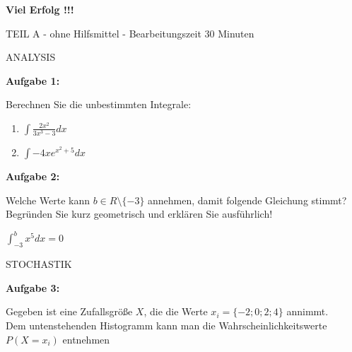 \documentclass[a4paper,12pt]{article}
\newcommand{\Aufgabe}[1]{
  {
  \vspace*{0.5cm}
  \textsf{\textbf{Aufgabe #1}}
  \vspace*{0.2cm}
  
  }
}
\begin{document}
\vspace{5cm}
\centerline{\huge\bfseries\sffamily Viel Erfolg !!!}

\newpage

\begin{center}
\vspace{0,5cm} {TEIL A} - ohne Hilfsmittel - Bearbeitungszeit 30 Minuten
\end{center}
\vspace {0,8cm}

ANALYSIS

\Aufgabe{1:} 
Berechnen Sie die unbestimmten Integrale:

\begin{enumerate}[label={\alph*)}]
  \item $ \int \frac{2x^2}{3x^3-3} dx $
  \item $ \int -4xe^{x^2+5} dx $
\end{enumerate}
\Aufgabe{2:}
Welche Werte kann $ b \in R\setminus \{ -3\}$ annehmen, damit folgende Gleichung stimmt? Begründen Sie kurz geometrisch und erklären Sie ausführlich!

 $ \int_ {-3}^{b} x^5 dx =0$

\vspace{2cm}
STOCHASTIK

\Aufgabe{3:}
Gegeben ist eine Zufallsgröße $X$, die die Werte $x_i = \{-2; 0; 2; 4\}$ annimmt.\\
Dem untenstehenden Histogramm kann man die Wahrscheinlichkeitswerte $P(X = x_i)$ entnehmen
\end{document}
